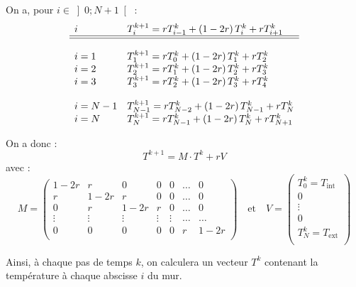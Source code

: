 \documentclass[10pt,fleqn]{article} %
\begin{document}
\ifprof
\begin{corrige}
On a, pour $i\in \left]0;N+1 \right[$ :
$$
\begin{array}{ll}
i & T_{i}^{k+1} = r T_{i-1}^{k} + \left( 1-2r \right) T_i^k + r T_{i+1}^k \\
\hline 
\hline 
\\
i=1 & T_{1}^{k+1} = r T_{0}^{k} + \left( 1-2r \right) T_1^k + r T_{2}^k \\
i=2 & T_{2}^{k+1} = r T_{1}^{k} + \left( 1-2r \right) T_2^k + r T_{3}^k \\
i=3 & T_{3}^{k+1} = r T_{2}^{k} + \left( 1-2r \right) T_3^k + r T_{4}^k \\
&\\
i=N -1& T_{N -1}^{k+1} = r T_{N -2}^{k} + \left( 1-2r \right) T_{N -1}^k + r T_{N}^k \\
i=N & T_{N}^{k+1} = r T_{N-1}^{k} + \left( 1-2r \right) T_N^k + r T_{N+1}^k \\
\end{array}
$$ 

On a donc : 
$$
T^{k+1} = M \cdot T^k + rV
$$
avec :
$$
M = 
\begin{pmatrix}
1-2r & r     & 0 & 0 & 0 &  \ldots & 0 \\
r     & 1-2r & r & 0 & 0  & \ldots &  0 \\
0    & r & 1-2r & r & 0   & \ldots&  0 \\
\vdots & \vdots & \vdots & \vdots & \vdots & \ldots & \ldots \\
0& 0& 0& 0& 0& r & 1-2r\\
\end{pmatrix}
\quad \text{et} \quad 
V = \begin{pmatrix}
T_0^k = T_{\text{int}} \\
0 \\
\vdots \\
0 \\
T_N^k = T_{\text{ext}} \\
\end{pmatrix}
$$

\end{corrige}


\else
\fi

Ainsi, à chaque pas de temps $k$, on calculera un vecteur $T^k$ contenant la température à chaque abscisse $i$ du mur.
\end{document}
